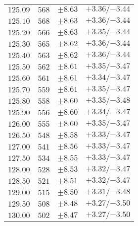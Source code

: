 \begin{table}[ht!]
\begin{center}
\begin{small}
\begin{tabular}{cccc}
$125.09$ & $568$ & $\pm8.63$ & ${{+3.36}}/{-3.44}$ \\
$125.10$ & $568$ & $\pm8.63$ & ${{+3.36}}/{-3.44}$ \\
$125.20$ & $566$ & $\pm8.63$ & ${{+3.35}}/{-3.44}$ \\
$125.30$ & $565$ & $\pm8.62$ & ${{+3.36}}/{-3.44}$ \\
$125.40$ & $563$ & $\pm8.62$ & ${{+3.36}}/{-3.44}$ \\
$125.50$ & $562$ & $\pm8.61$ & ${{+3.35}}/{-3.47}$ \\
$125.60$ & $561$ & $\pm8.61$ & ${{+3.34}}/{-3.47}$ \\
$125.70$ & $559$ & $\pm8.61$ & ${{+3.35}}/{-3.47}$ \\
$125.80$ & $558$ & $\pm8.60$ & ${{+3.35}}/{-3.48}$ \\
$125.90$ & $556$ & $\pm8.60$ & ${{+3.34}}/{-3.47}$ \\
$126.00$ & $555$ & $\pm8.60$ & ${{+3.35}}/{-3.47}$ \\
$126.50$ & $548$ & $\pm8.58$ & ${{+3.33}}/{-3.47}$ \\
$127.00$ & $541$ & $\pm8.56$ & ${{+3.33}}/{-3.47}$ \\
$127.50$ & $534$ & $\pm8.55$ & ${{+3.33}}/{-3.47}$ \\
$128.00$ & $528$ & $\pm8.53$ & ${{+3.32}}/{-3.47}$ \\
$128.50$ & $521$ & $\pm8.51$ & ${{+3.32}}/{-3.47}$ \\
$129.00$ & $515$ & $\pm8.50$ & ${{+3.31}}/{-3.48}$ \\
$129.50$ & $508$ & $\pm8.48$ & ${{+3.27}}/{-3.50}$ \\
$130.00$ & $502$ & $\pm8.47$ & ${{+3.27}}/{-3.50}$ \\
\bottomrule
\end{tabular}%
\end{small}%
\end{center}%
\end{table}

